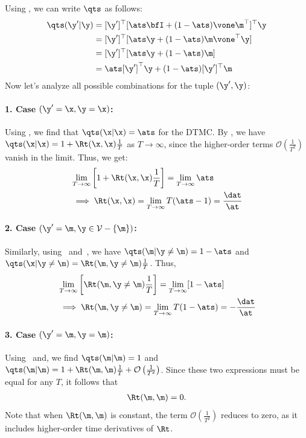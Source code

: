 \documentclass{article} %
\def\onehotset{\mathcal{V}}
\begin{document}
{\begin{appendices}
Using , we can write $\qts$ as follows:
\begin{align}\label{eqn:forward_scalar_probability}
    \qts(\y'| \y)
        & = [\y']^\top [\ats \bfI+ (1 - \ats)\vone \m^\top]^\top \y \nonumber \\
        & = [\y']^\top [\ats \y + (1 - \ats)\m \vone ^\top \y] \nonumber \\
        & = [\y']^\top [\ats \y + (1 - \ats)\m] \nonumber \\
        & = \ats [\y']^\top \y + (1 - \ats)[\y']^\top \m
\end{align}
Now let's analyze all possible combinations for the tuple $(\y', \y)$:

\paragraph{1. Case $(\y' = \x, \y = \x)$:} Using ,
we find that $\qts(\x|\x) = \ats$ for the DTMC. By , we have $\qts(\x | \x) = 1 + \Rt(\x, \x)\frac{1}{T}$ as $T \to \infty$, since the higher-order terms $\mathcal{O}\left(\frac{1}{T^2}\right)$ vanish in the limit. Thus, we get:
\begin{align}
    & \lim_{T \to \infty}\left[1 + \Rt(\x, \x)\frac{1}{T}\right] = \lim_{T \to \infty}\ats \nonumber \\
    & \implies \Rt(\x, \x) = \lim_{T \to \infty} T (\ats - 1) = \frac{\dat}{\at}
\end{align}

\paragraph{2. Case $(\y' = \m, \y \in \onehotset - \{\m\})$:} Similarly, using~ and~, we have $\qts(\m|\y \neq \m) = 1 - \ats$ and $\qts(\x | \y \neq \m) = \Rt(\m, \y \neq \m)\frac{1}{T}$. Thus, 
\begin{align}\label{eqn:mdlm_rate_mask}
    & \lim_{T \to \infty}\left[\Rt(\m, \y \neq \m)\frac{1}{T}\right] = \lim_{T \to \infty}[1 - \ats] \nonumber \\
    & \implies \Rt(\m, \y \neq \m) = \lim_{T \to \infty} T (1 - \ats ) = - \frac{\dat}{\at}
\end{align}

\paragraph{3. Case $(\y' = \m, \y = \m)$:} Using~ and, we find $\qts(\m|\m) = 1$ and $\qts(\m | \m) = 1 + \Rt(\m, \m)\frac{1}{T} + \mathcal{O}\left(\frac{1}{T^2}\right)$. Since these two expressions must be equal for any $T$, it follows that
\begin{align}
    \Rt(\m, \m) =  0.
\end{align}
Note that when $\Rt(\m, \m)$ is constant, the term $\mathcal{O}\left(\frac{1}{T^2}\right)$ reduces to zero, as it includes higher-order time derivatives of $\Rt$.


\end{appendices}}
\end{document}
